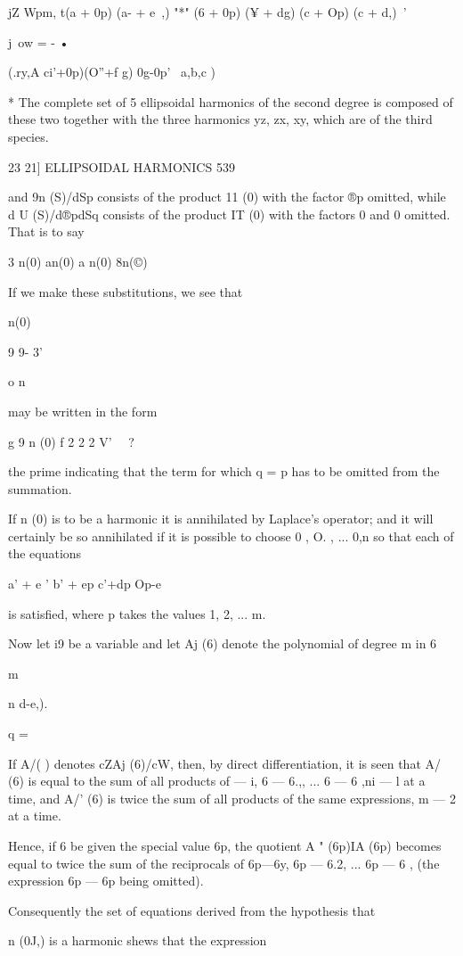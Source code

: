   jZ Wpm, t(a + 0p) (a- + e~,) "*" (6 + 0p) (¥ + dg) (c + Op) (c +
d,)\ '

j\ ow = - •

(.ry,A ci'+0p)(O''+f g) 0g-0p' \ a,b,c )

* The complete set of 5 ellipsoidal harmonics of the second degree is
composed of these two together with the three harmonics yz, zx, xy,
which are of the third species.

23 21] ELLIPSOIDAL HARMONICS 539

and 9n (S)/dSp consists of the product 11 (0) with the factor ®p
omitted, while d U (S)/d®pdSq consists of the product IT (0) with the
factors 0 and 0 omitted. That is to say

3 n(0) an(0) a n(0) 8n(©)

If we make these substitutions, we see that

n(0)

9 9- 3'

 o n

may be written in the form

g 9 n (0) f 2 2 2 V' \ \ ?\

the prime indicating that the term for which q = p has to be omitted
from the summation.

If n (0) is to be a harmonic it is annihilated by Laplace's operator;
and it will certainly be so annihilated if it is possible to choose 0
, O. , ... 0,n so that each of the equations

a' + e ' b' + ep c'+dp Op-e

is satisfied, where p takes the values 1, 2, ... m.

Now let i9 be a variable and let Aj (6) denote the polynomial of
degree m in 6

m

n d-e,).

q = \

If A/( ) denotes cZAj (6)/cW, then, by direct differentiation, it is
seen that A/ (6) is equal to the sum of all products of — i, 6 — 6.,,
... 6 — 6 ,ni — l at a time, and A/' (6) is twice the sum of all
products of the same expressions, m — 2 at a time.

Hence, if 6 be given the special value 6p, the quotient A " (6p)IA
(6p) becomes equal to twice the sum of the reciprocals of 6p—6y, 6p —
6.2, ... 6p — 6 , (the expression 6p — 6p being omitted).

Consequently the set of equations derived from the hypothesis that

n (0J,) is a harmonic shews that the expression

